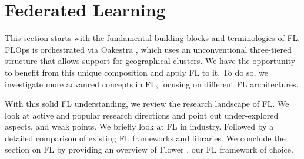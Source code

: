 \section{Federated Learning}\label{section:federated_learning}

This section starts with the fundamental building blocks and terminologies of FL.
FLOps is orchestrated via Oakestra \cite{paper:oakestra_usenix}, which uses an unconventional
three-tiered structure that allows support for geographical clusters.
We have the opportunity to benefit from this unique composition and apply FL to it.
To do so, we investigate more advanced concepts in FL, focusing on different FL architectures.

With this solid FL understanding, we review the research landscape of FL.
We look at active and popular research directions and point out under-explored aspects,
and weak points.
We briefly look at FL in industry.
Followed by a detailed comparison of existing FL frameworks and libraries.
We conclude the section on FL by providing an overview of Flower \cite{flower_docs}, our FL framework of choice.








